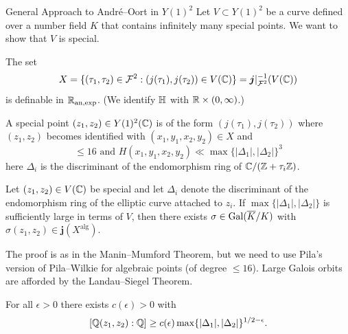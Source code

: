 \documentclass{beamer}
\begin{document}
\begin{frame}{General Approach to Andr\'e--Oort in $Y(1)^2$}
  Let $V\subset Y(1)^2$ be a curve defined over a number field $K$
  that contains infinitely many special points.
  We want to show that $V$ is special.
  
  The set
  \begin{equation}
    \label{def:Xao}
    X = \{(\tau_1,\tau_2) \in {\mathcal F}^2 : (j(\tau_1),j(\tau_2)) \in V({\mathbb{C}}) \} =
    \boldsymbol{j}|_{{\mathcal F}^2}^{-1}(V({\mathbb{C}}))
  \end{equation}
  is \alert{definable} in ${{\mathbb{R}}_{\mathrm{an,exp}}}$. (We identify ${\mathbb{H}}$ with
  ${\mathbb{R}}\times(0,\infty)$.)

  
  A special point $(z_1,z_2) \in Y(1)^2({\mathbb{C}})$ is of the form
  $(j(\tau_1),j(\tau_2))$ where  $(z_1,z_2)$ becomes identified with
  $(x_1,y_1,x_2,y_2) \in X$ and
  \begin{equation*}
    [\IQ(x_1,y_1,x_2,y_2):\IQ]\le 16\text{ and }
    H(x_1,y_1,x_2,y_2) \ll \max\{|\Delta_1|,|\Delta_2|\}^3
  \end{equation*}
  here $\Delta_i$ is the discriminant of the endomorphism ring
  of ${\mathbb{C}}/({\mathbb{Z}}+\tau_i{\mathbb{Z}})$. 
\end{frame}

\begin{frame}
  \begin{lemma}
    Let $(z_1,z_2)\in V({\mathbb{C}})$ be special and let $\Delta_i$ denote the discriminant
    of the endomorphism ring of the elliptic curve attached to $z_i$.
    If $\max\{|\Delta_1|,|\Delta_2|\}$ is sufficiently large in terms of
    $V$, then there exists $\sigma\in \mathrm{Gal}(\overline{K}/K)$ with
    $\sigma(z_1,z_2)\in \boldsymbol{j}(X^{\mathrm{alg}})$.   
  \end{lemma}
  
  The proof is as in the Manin--Mumford Theorem, but we need to use
  Pila's version of Pila--Wilkie for algebraic points (of degree $\le
  16$).
  Large Galois orbits are afforded by the \alert{Landau--Siegel}
  Theorem.

  \begin{theorem}
    For all $\epsilon > 0$ there exists $c(\epsilon)>0$ with
    $$[{\mathbb{Q}}(z_1,z_2):{\mathbb{Q}}] \ge c(\epsilon)
    \max\{|\Delta_1|,|\Delta_2|\}^{1/2-\epsilon}.$$
  \end{theorem}
\end{frame}
\end{document}
